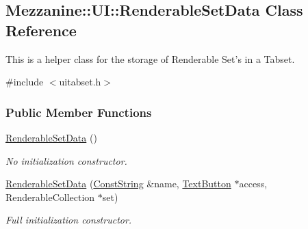 \hypertarget{structMezzanine_1_1UI_1_1RenderableSetData}{
\subsection{Mezzanine::UI::RenderableSetData Class Reference}
\label{structMezzanine_1_1UI_1_1RenderableSetData}
}


This is a helper class for the storage of Renderable Set's in a Tabset.  




{\ttfamily \#include $<$uitabset.h$>$}

\subsubsection*{Public Member Functions}
\begin{DoxyCompactItemize}
\item 
\hypertarget{structMezzanine_1_1UI_1_1RenderableSetData_a04bb953c8cbd013bd415ffa71030dc50}{
\hyperlink{structMezzanine_1_1UI_1_1RenderableSetData_a04bb953c8cbd013bd415ffa71030dc50}{RenderableSetData} ()}
\label{structMezzanine_1_1UI_1_1RenderableSetData_a04bb953c8cbd013bd415ffa71030dc50}

\begin{DoxyCompactList}\small\item\em No initialization constructor. \item\end{DoxyCompactList}\item 
\hypertarget{structMezzanine_1_1UI_1_1RenderableSetData_a99fffd89dc88713112260a68dfaad1c4}{
\hyperlink{structMezzanine_1_1UI_1_1RenderableSetData_a99fffd89dc88713112260a68dfaad1c4}{RenderableSetData} (\hyperlink{namespaceMezzanine_a63cd699ac54b73953f35ec9cfc05e506}{ConstString} \&name, \hyperlink{classMezzanine_1_1UI_1_1TextButton}{TextButton} $\ast$access, RenderableCollection $\ast$set)}
\label{structMezzanine_1_1UI_1_1RenderableSetData_a99fffd89dc88713112260a68dfaad1c4}

\begin{DoxyCompactList}\small\item\em Full initialization constructor. \item\end{DoxyCompactList}\end{DoxyCompactItemize}
